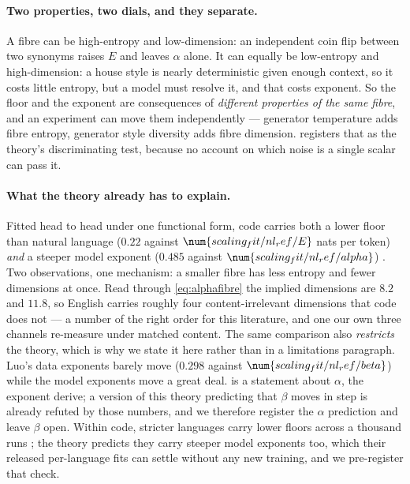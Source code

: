 \paragraph{Two properties, two dials, and they separate.}
A fibre can be high-entropy and low-dimension:
an independent coin flip between two synonyms raises \(E\) and leaves \(\alpha\)
alone.
It can equally be low-entropy and high-dimension:
a house style is nearly deterministic given enough context, so it costs little
entropy, but a model must resolve it, and that costs exponent.
So the floor and the exponent are consequences of \emph{different properties of
the same fibre}, and an experiment can move them independently --- generator
temperature adds fibre entropy, generator style diversity adds fibre dimension.
 registers that as the theory's discriminating test,
because no account on which noise is a single scalar can pass it.

\paragraph{What the theory already has to explain.}
Fitted head to head under one functional form, code carries both a lower floor
than natural language (\(0.22\) against \(\num{scaling_fit/nl_ref/E}\) nats per token) \emph{and} a
steeper model exponent (\(0.485\) against \(\num{scaling_fit/nl_ref/alpha}\))
\citep{luo2025codescalingdatahungry, hoffmann2022chinchilla}.
Two observations, one mechanism:
a smaller fibre has less entropy and fewer dimensions at once.
Read through \cref{eq:alphafibre} the implied dimensions are \(8.2\) and
\(11.8\), so English carries roughly four content-irrelevant dimensions that
code does not --- a number of the right order for this literature, and one our
own three channels re-measure under matched content.
The same comparison also \emph{restricts} the theory, which is why we state it
here rather than in a limitations paragraph.
Luo's data exponents barely move (\(0.298\) against \(\num{scaling_fit/nl_ref/beta}\)) while the model
exponents move a great deal.
 is a statement about \(\alpha\), the exponent
\citet{sharma2022manifold} derive;
a version of this theory predicting that \(\beta\) moves in step is already
refuted by those numbers, and we therefore register the \(\alpha\) prediction
and leave \(\beta\) open.
Within code, stricter languages carry lower floors across a thousand runs
\citep{yang2026codescaling};
the theory predicts they carry steeper model exponents too, which their released
per-language fits can settle without any new training, and we pre-register that
check.


